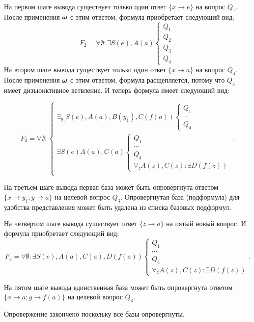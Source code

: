 \begin{example}
На первом шаге вывода существует только один ответ $\{x \rightarrow e\}$ на вопрос $Q_1$. После применения $\boldsymbol{\omega}$ с этим ответом, формула приобретает следующий вид:
\begin{equation*}\label{ex:f2}
	F_2 = \forall \emptyset\colon \exists S(e),A(a)
	\left\lbrace
	\begin{array}{l}
		Q_1 \\
		Q_2 \\
		Q_3 \\
		Q_4
	\end{array}\right..
\end{equation*}
На втором шаге вывода существует только один ответ $\{x \rightarrow a\}$ на вопрос $Q_4$. После применения $\boldsymbol{\omega}$ с этим ответом, формула расщепляется, потому что $Q_4$ имеет дизъюнктивное ветвление. И теперь формула имеет следующий вид:

\begin{equation*}\label{ex:f3}
F_3 =
\forall\emptyset\colon
\left\lbrace
\begin{array}{l}
	\exists_{y_1} S(e),A(a),B(y_1),C(f(a))
	\left\lbrace
	\begin{array}{l}
		Q_1 \\ \cdots \\ Q_4
	\end{array}\right. \\
	\exists S(e)A(a),C(a)
	\left\lbrace
	\begin{array}{l}
		Q_1 \\ \cdots \\ Q_4 \\
		\forall_z A(z),C(z)\colon \exists D(f(z))
	\end{array}\right. \\
\end{array}\right..
\end{equation*}

На третьем шаге вывода первая база может быть опровергнута ответом $\{x \rightarrow y_1; y \rightarrow a\}$ на целевой вопрос $Q_3$. Опровергнутая база (подформула) для удобства представления может быть удалена из списка базовых подформул.

На четвертом шаге вывода существует ответ $\{z \rightarrow a\}$ на пятый новый вопрос. И формула приобретает следующий вид:
\begin{equation*}\label{ex:f5}
	F_4 = \forall\emptyset\colon \exists S(e),A(a), C(a),D(f(a))
	\left\lbrace
	\begin{array}{l}
		Q_1 \\ \cdots \\ Q_4 \\
		\forall_z A(z),C(z)\colon \exists D(f(z))
	\end{array}\right..
\end{equation*}

На пятом шаге вывода единственная база может быть опровергнута ответом $\{x \rightarrow a; y \rightarrow f(a)\}$ на целевой вопрос $Q_4$.

Опровержение закончено поскольку все базы опровергнуты.

\end{example}

